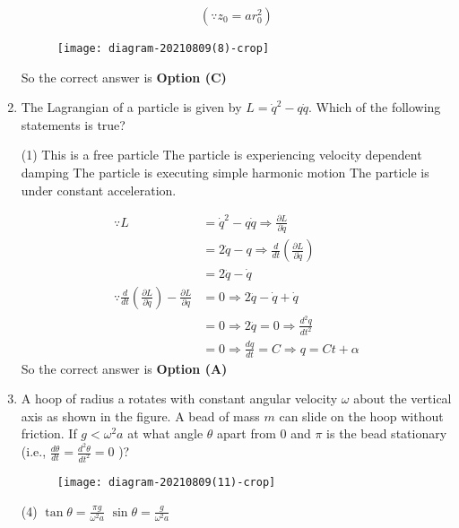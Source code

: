 \begin{enumerate}
\begin{answer}
\begin{align*}
	\left(\because z_{0}=a r_{0}^{2}\right)
	\end{align*}
	\begin{figure}[H]
		\centering
		\texttt{[image: diagram-20210809(8)-crop]}
	\end{figure}
	So the correct answer is \textbf{Option (C)}
\end{answer}
	\item The Lagrangian of a particle is given by $L=\dot{q}^{2}-q \dot{q}$. Which of the following statements is true?
	{}
	\begin{tasks}(1)
		\task[\textbf{A.}]  This is a free particle
		\task[\textbf{B.}] The particle is experiencing velocity dependent damping
		\task[\textbf{C.}] The particle is executing simple harmonic motion
		\task[\textbf{D.}] The particle is under constant acceleration.
	\end{tasks}
\begin{answer}
	\begin{align*}
	\because L&=\dot{q}^{2}-q \dot{q} \Rightarrow \frac{\partial L}{\partial \dot{q}}\\&=2 \dot{q}-q \Rightarrow \frac{d}{d t}\left(\frac{\partial L}{\partial \dot{q}}\right)\\&=2 \ddot{q}-\dot{q}\\
	\because \frac{d}{d t}\left(\frac{\partial L}{\partial \dot{q}}\right)-\frac{\partial L}{\partial q}&=0
	\Rightarrow 2 \ddot{q}-\dot{q}+\dot{q}\\&=0 \Rightarrow 2 \ddot{q}=0 \Rightarrow \frac{d^{2} q}{d t^{2}}\\&=0 \Rightarrow \frac{d q}{d t}=C \Rightarrow q=C t+\alpha
	\end{align*}
	So the correct answer is \textbf{Option (A)}
\end{answer}
	\item A hoop of radius a rotates with constant angular velocity $\omega$ about the
	vertical axis as shown in the figure. A bead of mass $m$ can slide on the
	hoop without friction. If $g<\omega^{2} a$ at what angle $\theta$ apart from 0 and $\pi$ is the bead stationary (i.e., $\frac{d \theta}{d t}=\frac{d^{2} \theta}{d t^{2}}=0$ )?
	{}
	\begin{figure}[H]
		\centering
		\texttt{[image: diagram-20210809(11)-crop]}
	\end{figure}
	\begin{tasks}(4)
		\task[\textbf{A.}] $\tan \theta=\frac{\pi g}{\omega^{2} a}$
		\task[\textbf{B.}] $\sin \theta=\frac{g}{\omega^{2} a}$

\end{tasks}
\end{enumerate}
